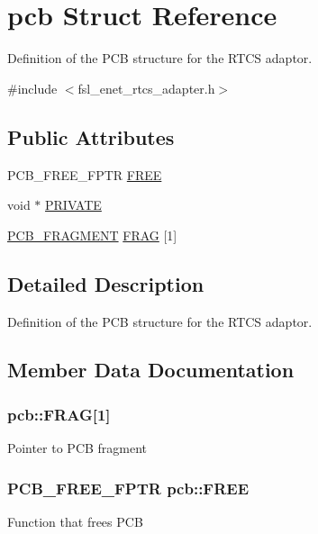 \hypertarget{structpcb}{}\section{pcb Struct Reference}
\label{structpcb}


Definition of the P\+CB structure for the R\+T\+CS adaptor.  




{\ttfamily \#include $<$fsl\+\_\+enet\+\_\+rtcs\+\_\+adapter.\+h$>$}

\subsection*{Public Attributes}
\begin{DoxyCompactItemize}
\item 
P\+C\+B\+\_\+\+F\+R\+E\+E\+\_\+\+F\+P\+TR \hyperlink{structpcb_a531e92dac32228e1fdb6e31383690e25}{F\+R\+EE}
\item 
void $\ast$ \hyperlink{structpcb_a986cbc4d4ee860e5891b0254d4f8af84}{P\+R\+I\+V\+A\+TE}
\item 
\hyperlink{group__enet__rtcs__adaptor_gab13091728cbbfc60133eca38ad2bbccc}{P\+C\+B\+\_\+\+F\+R\+A\+G\+M\+E\+NT} \hyperlink{structpcb_a226a1f379c6a9b19f9867d6d0955aa43}{F\+R\+AG} \mbox{[}1\mbox{]}
\end{DoxyCompactItemize}


\subsection{Detailed Description}
Definition of the P\+CB structure for the R\+T\+CS adaptor. 

\subsection{Member Data Documentation}
\subsubsection[{\texorpdfstring{F\+R\+AG}{FRAG}}]{ pcb\+::\+F\+R\+AG\mbox{[}1\mbox{]}}\hypertarget{structpcb_a226a1f379c6a9b19f9867d6d0955aa43}{}\label{structpcb_a226a1f379c6a9b19f9867d6d0955aa43}
Pointer to P\+CB fragment 
\subsubsection[{\texorpdfstring{F\+R\+EE}{FREE}}]{\setlength{\rightskip}{0pt plus 5cm}P\+C\+B\+\_\+\+F\+R\+E\+E\+\_\+\+F\+P\+TR pcb\+::\+F\+R\+EE}\hypertarget{structpcb_a531e92dac32228e1fdb6e31383690e25}{}\label{structpcb_a531e92dac32228e1fdb6e31383690e25}
Function that frees P\+CB 
